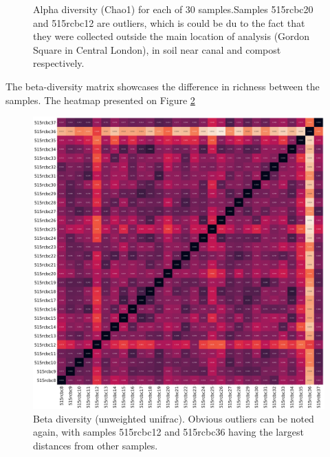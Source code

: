 \documentclass[12pt]{article}
\begin{document}
\begin{multicols}{2}
\begin{figure}[H]
	\caption{Alpha diversity (Chao1) for each of 30 samples.Samples 515rcbc20 and 515rcbc12 are outliers, which is could be du to the fact that they were collected outside the main location of analysis (Gordon Square in Central London), in soil near canal and compost respectively.}
	\label{fig:alpha_diversity}
\end{figure}

\par
The beta-diversity matrix showcases the difference in richness between the samples. The heatmap presented on Figure \ref{fig:beta_diversity} 

\begin{figure}[H]
	\captionsetup{width=\linewidth}
	\includegraphics[width=\linewidth]{../analyses/figs/unweighted_beta.png}
	\caption{Beta diversity (unweighted unifrac). Obvious outliers can be noted again, with samples 515rcbc12 and 515rcbc36 having the largest distances from other samples.}
	\label{fig:beta_diversity}
\end{figure}





\end{multicols}
\end{document}
